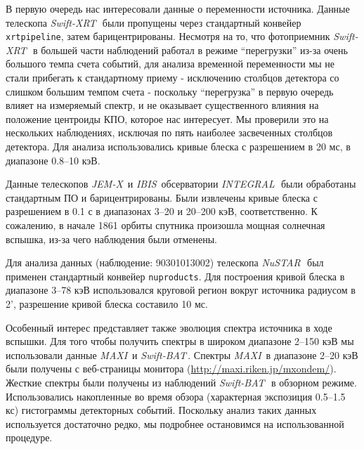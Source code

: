 \documentclass{pazhb}
\def\maxi{{\em MAXI}}
\def\swiftx{{\em Swift-XRT\,}}
\def\swiftb{{\em Swift-BAT\,}}
\def\nustar{{\em NuSTAR\,}}
\def\integral{{\em INTEGRAL\,}}
\def\jemx{{\em JEM-X}}
\def\ibis{ {\em IBIS}}
\begin{document}
В первую очередь нас интересовали данные о переменности источника. Данные телескопа \swiftx\, были пропущены через стандартный конвейер \texttt{xrtpipeline}, затем барицентрированы. Несмотря на то, что фотоприемник \swiftx\, в большей части наблюдений работал в режиме ``перегрузки'' из-за очень большого темпа счета событий, для анализа временной переменности мы не стали прибегать к стандартному приему - исключению столбцов детектора со слишком большим темпом счета - поскольку ``перегрузка'' в первую очередь влияет на измеряемый спектр, и не оказывает существенного влияния на положение центроиды КПО, которое нас интересует. Мы проверили это на нескольких наблюдениях, исключая по пять наиболее засвеченных столбцов детектора. Для анализа использовались кривые блеска с разрешением в 20 мс, в диапазоне 0.8--10 кэВ.

Данные телескопов \jemx\, \citep{lund03} и \ibis\, \citep{ubertini03} обсерватории \integral\, были обработаны стандартным ПО и барицентрированы. Были извлечены кривые блеска с разрешением в 0.1 с в диапазонах 3--20 и 20--200 кэВ, соответственно. К сожалению, в начале 1861 орбиты спутника произошла мощная солнечная вспышка, из-за чего наблюдения были отменены.

Для анализа данных (наблюдение: 90301013002) телескопа \nustar\, был применен стандартный конвейер \texttt{nuproducts}. Для построения кривой блеска в диапазоне 3--78 кэВ использовался круговой регион вокруг источника радиусом в 2', разрешение кривой блеска составило 10 мс. 

Особенный интерес представляет также эволюция спектра источника в ходе вспышки. Для того чтобы получить спектры в широком диапазоне 2--150 кэВ мы использовали данные \maxi\, и \swiftb. Спектры \maxi\, в диапазоне 2--20 кэВ были получены с веб-страницы монитора (\url{http://maxi.riken.jp/mxondem/}). Жесткие спектры были получены из наблюдений \swiftb\, в обзорном режиме. Использовались накопленные во время обзора (характерная экспозиция 0.5--1.5 кс) гистограммы детекторных событий. Поскольку анализ таких данных используется достаточно редко, мы подробнее остановимся на использованной процедуре.
\end{document}
